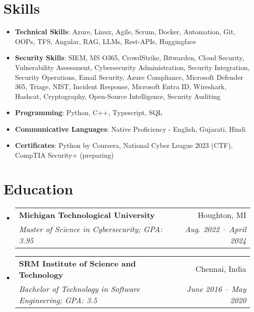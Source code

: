 \documentclass[a4paper,10pt]{article}
\makeatletter
\newcommand{\resumeItem}[2]{
  \item\small{
    \textbf{#1}{: #2 \vspace{-2pt}}
  }
}
\newcommand{\resumeSubheading}[4]{
  \vspace{-1pt}\item
    \begin{tabular*}{0.97\textwidth}[t]{l@{\extracolsep{\fill}}r}
      \textbf{#1} & #2 \\
      \textit{\small#3} & \textit{\small #4} \\
    \end{tabular*}\vspace{-5pt}
}
\newcommand{\resumeSubItem}[2]{\resumeItem{#1}{#2}\vspace{-4pt}}
\newcommand{\resumeSubHeadingListStart}{\begin{itemize}[leftmargin=*]}
\newcommand{\resumeSubHeadingListEnd}{\end{itemize}}
\makeatother
\begin{document}
\section{Skills}
  \resumeSubHeadingListStart
    \resumeSubItem{Technical Skills}
      {Azure, Linux, Agile, Scrum, Docker, Automation, Git, OOPs, TFS, Angular, RAG, LLMs, Rest-APIs, Huggingface}
    \resumeSubItem{Security Skills}
      {SIEM, MS O365, CrowdStrike, Bitwarden, Cloud Security, Vulnerability Assessment, Cybersecurity Administration, Security Integration, Security Operations, Email Security, Azure Compliance, Microsoft Defender 365, Triage, NIST, Incident Response, Microsoft Entra ID, Wireshark, Hashcat, Cryptography, Open-Source Intelligence, Security Auditing}
    \resumeSubItem{Programming}
      {Python, C++, Typescript, SQL}
    \resumeSubItem{Communicative Languages}
      {Native Proficiency - English, Gujarati, Hindi}
    \resumeSubItem{Certificates}
      {Python by Coursera, National Cyber League 2023 (CTF), CompTIA Security+ (preparing)}
  \resumeSubHeadingListEnd

\section{Education}
  \resumeSubHeadingListStart
    \resumeSubheading
      {Michigan Technological University}{Houghton, MI}
      {Master of Science in Cybersecurity; GPA: 3.95}{Aug. 2022 -- April 2024}
    \resumeSubheading
      {SRM Institute of Science and Technology}{Chennai, India}
      {Bachelor of Technology in Software Engineering; GPA: 3.5}{June 2016 -- May 2020}
  \resumeSubHeadingListEnd
  

\end{document}
